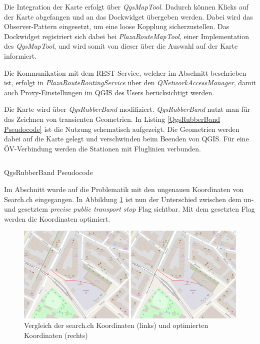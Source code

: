 Die Integration der Karte erfolgt über \emph{QgsMapTool}. Dadurch können Klicks auf der Karte abgefangen und an das Dockwidget übergeben werden. Dabei wird das Observer-Pattern \cite{gof_patterns} eingesetzt, um eine loose Kopplung sicherzustellen. Das Dockwidget registriert sich dabei bei \emph{PlazaRouteMapTool}, einer Implementation des \emph{QgsMapTool}, und wird somit von dieser über die Auswahl auf der Karte informiert.

Die Kommunikation mit dem \ac{REST}-Service, welcher im Abschnitt  beschrieben ist, erfolgt in \emph{PlazaRouteRoutingService} über den \emph{QNetworkAccessManager}, damit auch Proxy-Einstellungen im QGIS des Users berücksichtigt werden.

Die Karte wird über \emph{QgsRubberBand} modifiziert. \emph{QgsRubberBand} nutzt man für das Zeichnen von transienten Geometrien. In Listing \ref{QgsRubberBand Pseudocode} ist die Nutzung schematisch aufgezeigt. Die Geometrien werden dabei auf die Karte gelegt und verschwinden beim Beenden von QGIS. Für eine ÖV-Verbindung werden die Stationen mit Fluglinien verbunden.

\begin{listing}[ht]
    \inputminted{python}{projectdoc/listing/rubber_band.py}
    \caption{QgsRubberBand Pseudocode}
    \label{QgsRubberBand Pseudocode}
\end{listing}

Im Abschnitt  wurde auf die Problematik mit den ungenauen Koordinaten von Search.ch \cite{search_ch_route_api} eingegangen. In Abbildung \ref{fig:precise_public_transport_stops_comparison} ist nun der Unterschied zwischen dem un- und gesetztem \emph{precise public transport stop} Flag sichtbar. Mit dem gesetzten Flag werden die Koordinaten optimiert.

\begin{figure}[ht]
\centering
\includegraphics[width=1.0\linewidth]{projectdoc/img/precise_public_transport_stops_comparison}
\caption[Vergleich search.ch Koordinaten und optimierte Koordinaten]{Vergleich der search.ch Koordinaten (links) und optimierten Koordinaten (rechts)}
\label{fig:precise_public_transport_stops_comparison}
\end{figure}

